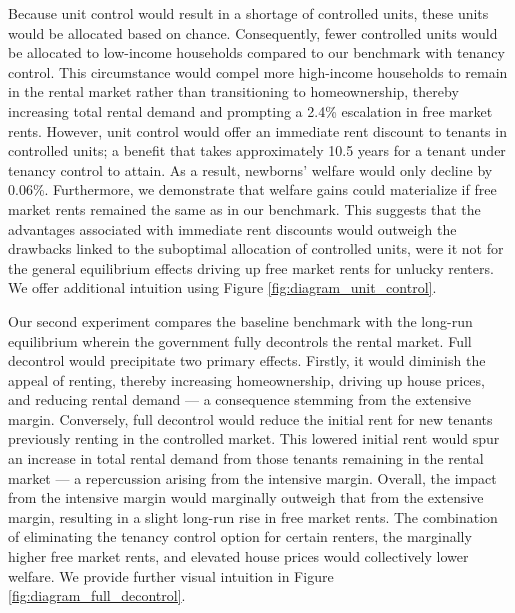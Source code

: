 \documentclass[parskip=full]{article}
\begin{document}
Because unit control would result in a shortage of controlled units, these units would be allocated based on chance. Consequently, fewer controlled units would be allocated to low-income households compared to our benchmark with tenancy control. This circumstance would compel more high-income households to remain in the rental market rather than transitioning to homeownership, thereby increasing total rental demand and prompting a 2.4\% escalation in free market rents. However, unit control would offer an immediate rent discount to tenants in controlled units; a benefit that takes approximately 10.5 years for a tenant under tenancy control to attain. As a result, newborns' welfare would only decline by 0.06\%. Furthermore, we demonstrate that welfare gains could materialize if free market rents remained the same as in our benchmark. This suggests that the advantages associated with immediate rent discounts would outweigh the drawbacks linked to the suboptimal allocation of controlled units, were it not for the general equilibrium effects driving up free market rents for unlucky renters. We offer additional intuition using Figure \ref{fig:diagram_unit_control}.

Our second experiment compares the baseline benchmark with the long-run equilibrium wherein the government fully decontrols the rental market. Full decontrol would precipitate two primary effects. Firstly, it would diminish the appeal of renting, thereby increasing homeownership, driving up house prices, and reducing rental demand --- a consequence stemming from the extensive margin. Conversely, full decontrol would reduce the initial rent for new tenants previously renting in the controlled market. This lowered initial rent would spur an increase in total rental demand from those tenants remaining in the rental market --- a repercussion arising from the intensive margin. Overall, the impact from the intensive margin would marginally outweigh that from the extensive margin, resulting in a slight long-run rise in free market rents. The combination of eliminating the tenancy control option for certain renters, the marginally higher free market rents, and elevated house prices would collectively lower welfare. We provide further visual intuition in Figure \ref{fig:diagram_full_decontrol}.
\end{document}
